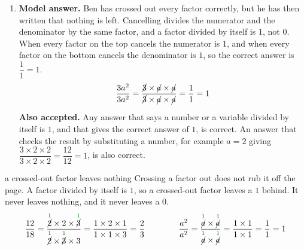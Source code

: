 \documentclass[12pt,a4paper]{article}
\newcommand{\modelans}{\par\smallskip
  \noindent\textbf{\color{blue!50!black}Model answer.}\space}
\newcommand{\alsoacc}{\par\smallskip
  \noindent\textbf{\color{blue!50!black}Also accepted.}\space}
\newcommand{\cancelone}[1]{\overset{\textcolor{green!45!black}{1}}{\cancel{#1}}}
\begin{document}
\begin{enumerate}
\item
\modelans
Ben has crossed out every factor correctly, but he has then written that
nothing is left. Cancelling divides the numerator and the denominator by the
same factor, and a factor divided by itself is $1$, not $0$. When every factor
on the top cancels the numerator is $1$, and when every factor on the bottom
cancels the denominator is $1$, so the correct answer is $\dfrac{1}{1}=1$.
\[\frac{3a^2}{3a^2}
  =\frac{\cancel{3}\times\cancel{a}\times\cancel{a}}
   {\cancel{3}\times\cancel{a}\times\cancel{a}}=\frac{1}{1}=1\]
\alsoacc
Any answer that says a number or a variable divided by itself is $1$, and that
gives the correct answer of $1$, is correct. An answer that checks the result
by substituting a number, for example $a=2$ giving
$\dfrac{3\times2\times2}{3\times2\times2}=\dfrac{12}{12}=1$, is also correct.
\end{enumerate}

\begin{mistake}{a crossed-out factor leaves nothing}
Crossing a factor out does not rub it off the page. A factor divided by itself
is $1$, so a crossed-out factor leaves a $1$ behind. It never leaves nothing,
and it never leaves a $0$.
\[\frac{12}{18}
  =\frac{\cancelone{2}\times2\times\cancelone{3}}
        {\cancelone{2}\times\cancelone{3}\times3}
  =\frac{1\times2\times1}{1\times1\times3}=\frac{2}{3}
  \qquad\qquad
  \frac{a^2}{a^2}
  =\frac{\cancelone{a}\times\cancelone{a}}{\cancelone{a}\times\cancelone{a}}
  =\frac{1\times1}{1\times1}=\frac{1}{1}=1\]
\end{mistake}
\end{document}
